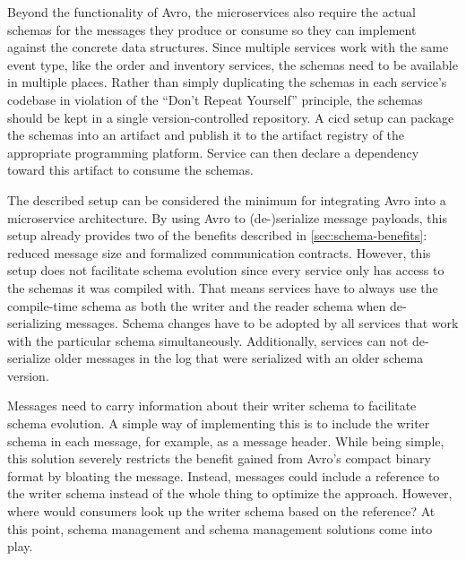 Beyond the functionality of Avro, the microservices also require the actual schemas for the messages they produce or consume so they can implement against the concrete data structures.
Since multiple services work with the same event type, like the order and inventory services, the schemas need to be available in multiple places.
Rather than simply duplicating the schemas in each service's codebase in violation of the \enquote{Don't Repeat Yourself} principle, the schemas should be kept in a single version-controlled repository.
A \gls{cicd} setup can package the schemas into an artifact and publish it to the artifact registry of the appropriate programming platform.
Service can then declare a dependency toward this artifact to consume the schemas.

The described setup can be considered the minimum for integrating Avro into a microservice architecture.
By using Avro to (de-)serialize message payloads, this setup already provides two of the benefits described in \ref{sec:schema-benefits}: reduced message size and formalized communication contracts.
However, this setup does not facilitate schema evolution since every service only has access to the schemas it was compiled with.
That means services have to always use the compile-time schema as both the writer and the reader schema when de-serializing messages.
Schema changes have to be adopted by all services that work with the particular schema simultaneously.
Additionally, services can not de-serialize older messages in the log that were serialized with an older schema version.

Messages need to carry information about their writer schema to facilitate schema evolution.
A simple way of implementing this is to include the writer schema in each message, for example, as a message header.
While being simple, this solution severely restricts the benefit gained from Avro's compact binary format by bloating the message.
Instead, messages could include a reference to the writer schema instead of the whole thing to optimize the approach.
However, where would consumers look up the writer schema based on the reference?
At this point, schema management and schema management solutions come into play.
